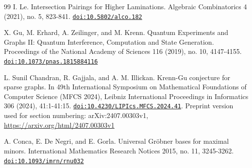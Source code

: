 \documentclass[11pt]{article}
\begin{document}
\begin{thebibliography}{99}
I. Le. Intersection Pairings for Higher Laminations. Algebraic Combinatorics 4 (2021), no. 5, 823-841. \mbox{\href{https://doi.org/10.5802/alco.182}{\nolinkurl{doi:10.5802/alco.182}}}


X. Gu, M. Erhard, A. Zeilinger, and M. Krenn. Quantum Experiments and Graphs II: Quantum Interference, Computation and State Generation. Proceedings of the National Academy of Sciences 116 (2019), no. 10, 4147-4155. \mbox{\href{https://doi.org/10.1073/pnas.1815884116}{\nolinkurl{doi:10.1073/pnas.1815884116}}}


L. Sunil Chandran, R. Gajjala, and A. M. Illickan. Krenn-Gu conjecture for sparse graphs. In 49th International Symposium on Mathematical Foundations of Computer Science (MFCS 2024), Leibniz International Proceedings in Informatics 306 (2024), 41:1-41:15. \mbox{\href{https://doi.org/10.4230/LIPIcs.MFCS.2024.41}{\nolinkurl{doi:10.4230/LIPIcs.MFCS.2024.41}}}. Preprint version used for section numbering: arXiv:2407.00303v1, \url{https://arxiv.org/html/2407.00303v1}


A. Conca, E. De Negri, and E. Gorla. Universal Gröbner bases for maximal minors. International Mathematics Research Notices 2015, no. 11, 3245-3262. \mbox{\href{https://doi.org/10.1093/imrn/rnu032}{\nolinkurl{doi:10.1093/imrn/rnu032}}}


\end{thebibliography}
\end{document}
